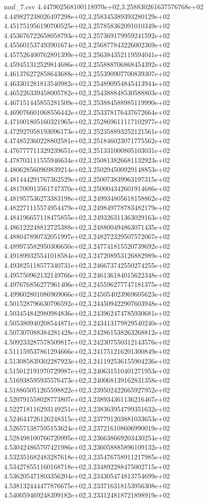 \begin{filecontents*}{muf_7.csv}
4.447902568100118970e+02,3.258830261637576768e+02
4.449827238026497298e+02,3.258345389393280129e+02
4.451751956190700525e+02,3.257858362091010349e+02
4.453676722658058793e+02,3.257369179959241592e+02
4.455601537493901674e+02,3.256877843226002369e+02
4.457526400762891399e+02,3.256384352119594041e+02
4.459451312529814686e+02,3.255888706868454392e+02
4.461376272858643688e+02,3.255390907700839307e+02
4.463301281813540982e+02,3.254890954845413944e+02
4.465226339458005782e+02,3.254388848530588803e+02
4.467151445855281509e+02,3.253884588985119990e+02
4.469076601068556442e+02,3.253378176437672664e+02
4.471001805160321965e+02,3.252869611117102977e+02
4.472927058193096173e+02,3.252358893252121561e+02
4.474852360228802581e+02,3.251846023071775562e+02
4.476777711329239651e+02,3.251331000805103031e+02
4.478703111555946634e+02,3.250813826681132923e+02
4.480628560969839214e+02,3.250294500929148853e+02
4.481444291767362529e+02,3.250073839963197315e+02
4.481700913561747370e+02,3.250004342601914686e+02
4.481957536273383198e+02,3.249934805618158862e+02
4.482271115574954479e+02,3.249849778783482179e+02
4.484196657118475855e+02,3.249326311363029163e+02
4.486122248812725388e+02,3.248800494863071435e+02
4.488047890732051997e+02,3.248272329507572067e+02
4.489973582950306650e+02,3.247741815520739692e+02
4.491899325541018584e+02,3.247208953126882989e+02
4.493825118577340731e+02,3.246673742550274255e+02
4.495750962132149766e+02,3.246136184015622348e+02
4.497676856277961406e+02,3.245596277747181375e+02
4.499602801086969066e+02,3.245054023969605623e+02
4.501528796630796592e+02,3.244509422907603948e+02
4.503454842980984836e+02,3.243962474785930681e+02
4.505380940208544871e+02,3.243413179829540240e+02
4.507307088384281428e+02,3.242861538263268812e+02
4.509233287578509817e+02,3.242307550312143576e+02
4.511159537861294666e+02,3.241751216201300849e+02
4.513085839302287923e+02,3.241192536155904236e+02
4.515012191970729987e+02,3.240631510401271953e+02
4.516938595935576473e+02,3.240068139162831358e+02
4.518865051265598822e+02,3.239502422665927952e+02
4.520791558028773807e+02,3.238934361136216467e+02
4.522718116293149251e+02,3.238363954799351632e+02
4.524644726126248315e+02,3.237791203881033653e+02
4.526571387595153624e+02,3.237216108606990019e+02
4.528498100766720995e+02,3.236638669203430254e+02
4.530424865707421986e+02,3.236058885896109132e+02
4.532351682483287618e+02,3.235476758911217985e+02
4.534278551160168718e+02,3.234892288475002715e+02
4.536205471803356204e+02,3.234305474813754699e+02
4.538132444477876675e+02,3.233716318153956308e+02
4.540059469248399182e+02,3.233124818721898919e+02

\end{filecontents*}
